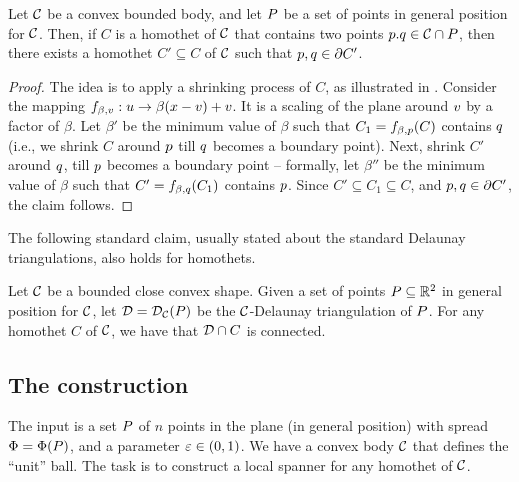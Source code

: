 \documentclass[12pt]{article}%
\begin{document}
\begin{lemma}
    Let $\mathcal{C}$ be a convex bounded body, and let $P$ be a set of
    points in general position for $\mathcal{C}$. Then, if $C$ is a homothet
    of $\mathcal{C}$ that contains two points $p. q \in \mathcal{C} \cap P$,
    then there exists a homothet $C' \subseteq C$ of $\mathcal{C}$ such that
    $p, q \in \partial C'$.
\end{lemma}
\begin{proof}
    The idea is to apply a shrinking process of $C$, as illustrated in
    .  Consider the mapping
    $f_{\beta, v} : u \rightarrow \beta (x - v) + v $. It is
    a scaling of the plane around $v$ by a factor of $\beta$. Let
    $\beta'$ be the minimum value of $\beta$ such that
    $C_1 = f_{\beta,p}(C)$ contains $q$ (i.e., we shrink $C$
    around $p$ till $q$ becomes a boundary point). Next, shrink
    $C'$ around $q$, till $p$ becomes a boundary point --
    formally, let $\beta''$ be the minimum value of $\beta$ such that
    $C' = f_{\beta,q}(C_1)$ contains $p$. Since
    $C' \subseteq C_1 \subseteq C$, and $p, q \in \partial C'$,
    the claim follows.
\end{proof}

The following standard claim, usually stated about the standard
Delaunay triangulations, also holds for homothets.

\SaveContent{\ClaimDelConnected}%
{%
   Let $\mathcal{C}$ be a bounded close convex shape.  Given a set of points
   $P \subseteq \mathbb{R}^2$ in general position for $\mathcal{C}$, let
   $\mathcal{D} = \mathcal{D}_{\mathcal{C}}(P)$ be the $\mathcal{C}$-Delaunay triangulation of
   $P$. For any homothet $C$ of $\mathcal{C}$, we have that
   $\mathcal{D} \cap {C}$ is connected.%
}

\medskip%
\begin{claim}
    \ClaimDelConnected{}
\end{claim}



 



\subsection{The construction}

The input is a set $P$ of $n$ points in the plane (in general
position) with spread $\spread = \spreadX{\PS}$, and a parameter
$\varepsilon \in (0,1)$. We have a convex body $\mathcal{C}$ that defines the
``unit'' ball. The task is to construct a local spanner for any
homothet of $\mathcal{C}$.
\end{document}
